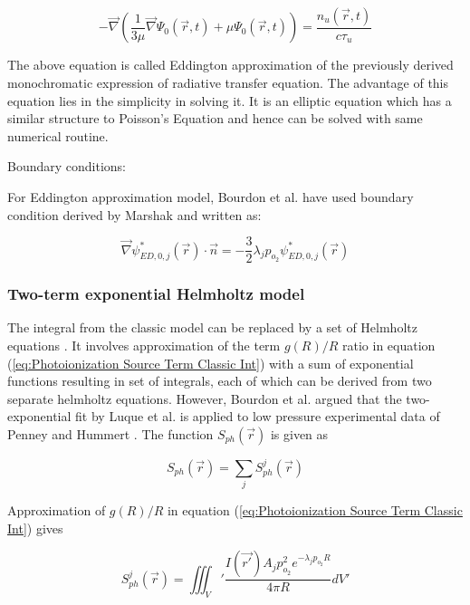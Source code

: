\documentclass[paper=a4, fontsize=13pt]{scrartcl}
\begin{document}
\begin{equation} 
-\vec{\nabla}(\frac{1}{3\mu} \vec{\nabla}\Psi_0(\vec{r},t) + \mu \Psi_0(\vec{r},t)) = \frac{n_u (\vec{r},t)}{c \tau_{u}}
\end{equation} 

The above equation is called Eddington approximation of the previously derived monochromatic expression of radiative transfer equation. The advantage of this equation lies in the simplicity in solving it. It is an elliptic equation which has a similar structure to Poisson's Equation and hence can be solved with same numerical routine. 

Boundary conditions:

For Eddington approximation model, Bourdon et al. \cite{Bourdon2007EfficientEquations} have used boundary condition derived by Marshak \cite{Pomraning1982RadiationHydrodynamics} and written as:

\begin{equation} 
\vec{\nabla} \psi_{ED,0,j}^* (\vec{r}) \cdot \vec{n} = - \frac{3}{2} \lambda_j p_{o_2} \psi_{ED,0,j}^* (\vec{r})
\end{equation} 


\subsubsection{Two-term exponential Helmholtz model}

The integral from the classic model can be replaced by a set of Helmholtz equations \cite{Luque2007PhotoionizationModes}. It involves approximation of the term $g(R)/R$ ratio in equation (\ref{eq:Photoionization Source Term Classic Int}) with a sum of exponential functions resulting in set of integrals, each of which can be derived from two separate helmholtz equations. However, Bourdon et al. \cite{Bourdon2007EfficientEquations} argued that the two-exponential fit by Luque et al. \cite{Luque2007PhotoionizationModes} is applied to low pressure experimental data of Penney and Hummert \cite{Penney1970PhotoionizationNitrogen}. The function $S_{ph}(\vec{r})$ is given as

\begin{equation} 
S_{ph} (\vec{r}) = \sum_j S_{ph}^j (\vec{r})
\end{equation} 

Approximation of $g(R)/R$ in equation (\ref{eq:Photoionization Source Term Classic Int}) gives

\begin{equation} 
S_{ph}^j (\vec{r}) = \iiint_V' \frac{I(\vec{r'}) A_j p_{o_2}^2 e^{- \lambda_j p_{o_2} R }}{4 \pi R} dV'
\end{equation} 
\end{document}
